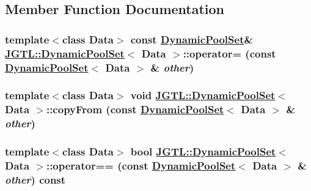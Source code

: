 \subsection{Member Function Documentation}
\hypertarget{class_j_g_t_l_1_1_dynamic_pool_set_dd18f7df0d3a13b31f53a13a755cd729}{
\subsubsection[operator=]{\setlength{\rightskip}{0pt plus 5cm}template$<$class Data$>$ const \hyperlink{class_j_g_t_l_1_1_dynamic_pool_set}{Dynamic\-Pool\-Set}\& \hyperlink{class_j_g_t_l_1_1_dynamic_pool_set}{JGTL::Dynamic\-Pool\-Set}$<$ Data $>$::operator= (const \hyperlink{class_j_g_t_l_1_1_dynamic_pool_set}{Dynamic\-Pool\-Set}$<$ Data $>$ \& {\em other})}}
\label{class_j_g_t_l_1_1_dynamic_pool_set_dd18f7df0d3a13b31f53a13a755cd729}


\hypertarget{class_j_g_t_l_1_1_dynamic_pool_set_b3dbb5689852c8b7305bb5e51b6f0a5f}{
\subsubsection[copyFrom]{\setlength{\rightskip}{0pt plus 5cm}template$<$class Data$>$ void \hyperlink{class_j_g_t_l_1_1_dynamic_pool_set}{JGTL::Dynamic\-Pool\-Set}$<$ Data $>$::copy\-From (const \hyperlink{class_j_g_t_l_1_1_dynamic_pool_set}{Dynamic\-Pool\-Set}$<$ Data $>$ \& {\em other})}}
\label{class_j_g_t_l_1_1_dynamic_pool_set_b3dbb5689852c8b7305bb5e51b6f0a5f}


\hypertarget{class_j_g_t_l_1_1_dynamic_pool_set_6b6a5c1f4536294a29afaa22417c761a}{
\subsubsection[operator==]{\setlength{\rightskip}{0pt plus 5cm}template$<$class Data$>$ bool \hyperlink{class_j_g_t_l_1_1_dynamic_pool_set}{JGTL::Dynamic\-Pool\-Set}$<$ Data $>$::operator== (const \hyperlink{class_j_g_t_l_1_1_dynamic_pool_set}{Dynamic\-Pool\-Set}$<$ Data $>$ \& {\em other}) const}}
\label{class_j_g_t_l_1_1_dynamic_pool_set_6b6a5c1f4536294a29afaa22417c761a}


